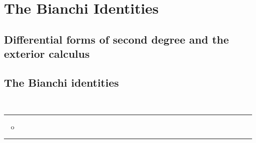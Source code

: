 
\chapter{The Bianchi Identities}


\section{Differential forms of second degree and the exterior calculus}
             
%
%
%


\section{The Bianchi identities}

%
%
%
%
%

\ \\[.5cm]
\begin{center}
\rule{2cm}{.03cm} \ \ o \ \ \rule{2cm}{.03cm} 
\end{center} 


%






























